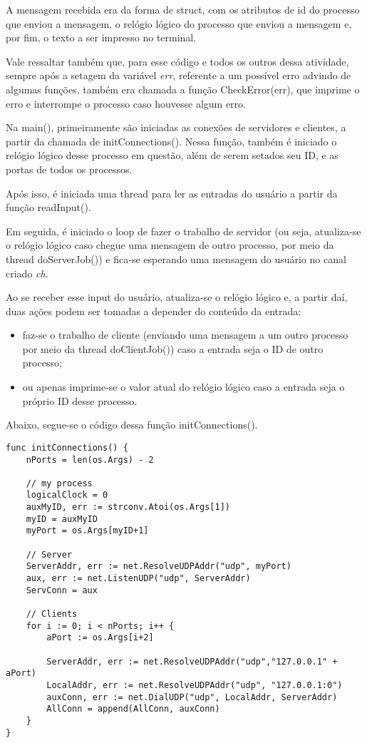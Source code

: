 \documentclass[conference]{IEEEtran}
\begin{document}
	A mensagem recebida era da forma de struct, com os atributos de id do processo que enviou a mensagem, o relógio lógico do processo que enviou a mensagem e, por fim, o texto a ser impresso no terminal.

	Vale ressaltar também que, para esse código e todos os outros dessa atividade, sempre após a setagem da variável \textit{err}, referente a um possível erro advindo de algumas funções, também era chamada a função CheckError(err), que imprime o erro e interrompe o processo caso houvesse algum erro.

	Na main(), primeiramente são iniciadas as conexões de servidores e clientes, a partir da chamada de initConnections(). Nessa função, também é iniciado o relógio lógico desse processo em questão, além de serem setados seu ID, e as portas de todos os processos. 
	
	Após isso, é iniciada uma thread para ler as entradas do usuário a partir da função readInput().
	
	Em seguida, é iniciado o loop de fazer o trabalho de servidor (ou seja, atualiza-se o relógio lógico caso chegue uma mensagem de outro processo, por meio da thread doServerJob()) e fica-se esperando uma mensagem do usuário no canal criado \textit{ch}.
	
	Ao se receber esse input do usuário, atualiza-se o relógio lógico e, a partir daí, duas ações podem ser tomadas a depender do conteúdo da entrada: 
	
\begin{itemize}
\item faz-se o trabalho de cliente (enviando uma mensagem a um outro processo por meio da thread doClientJob()) caso a entrada seja o ID de outro processo;
\item ou apenas imprime-se o valor atual do relógio lógico caso a entrada seja o próprio ID desse processo.
\end{itemize}
	
	Abaixo, segue-se o código dessa função initConnections().
	
\begin{lstlisting}
func initConnections() {
	nPorts = len(os.Args) - 2

	// my process
	logicalClock = 0
	auxMyID, err := strconv.Atoi(os.Args[1])
	myID = auxMyID
	myPort = os.Args[myID+1]

	// Server
	ServerAddr, err := net.ResolveUDPAddr("udp", myPort)
	aux, err := net.ListenUDP("udp", ServerAddr)
	ServConn = aux

	// Clients
	for i := 0; i < nPorts; i++ {
		aPort := os.Args[i+2]
		
		ServerAddr, err := net.ResolveUDPAddr("udp","127.0.0.1" + aPort)
		LocalAddr, err := net.ResolveUDPAddr("udp", "127.0.0.1:0")
		auxConn, err := net.DialUDP("udp", LocalAddr, ServerAddr)
		AllConn = append(AllConn, auxConn)
	}
}
\end{lstlisting}
\end{document}
